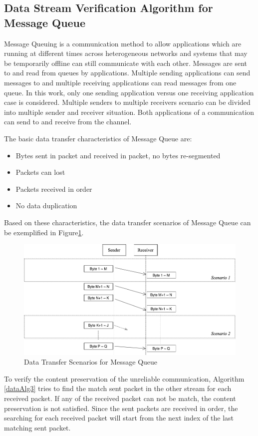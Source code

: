 \subsection{Data Stream Verification Algorithm for Message Queue}
Message Queuing is a communication method to allow applications which are running at different times across heterogeneous networks and systems that may be temporarily offline can still communicate with each other. Messages are sent to and read from queues by applications. Multiple sending applications can send messages to and multiple receiving applications can read messages from one queue.\cite{redkar2004pro} In this work, only one sending application versus one receiving application case is considered. Multiple senders to multiple receivers scenario can be divided into multiple sender and receiver situation. Both applications of a communication can send to and receive from the channel.

The basic data transfer characteristics of Message Queue are:
\begin{itemize}
  \item Bytes sent in packet and received in packet, no bytes re-segmented
  \item Packets can lost
  \item Packets received in order
  \item No data duplication
\end{itemize}
Based on these characteristics, the data transfer scenarios of Message Queue can be exemplified in Figure\ref{msmq}.
\begin{figure}[H]
\centerline{\includegraphics[scale=0.4]{Figures/msmq}}
\caption{Data Transfer Scenarios for Message Queue}
\label{msmq}
\end{figure}

To verify the content preservation of the unreliable communication, Algorithm \ref{dataAlg3} tries to find the match sent packet in the other stream for each received packet. If any of the received packet can not be match, the content preservation is not satisfied. Since the sent packets are received in order, the searching for each received packet will start from the next index of the last matching sent packet. 

